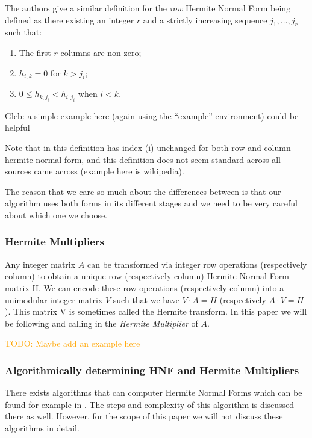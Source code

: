 \documentclass[oneside, a4paper, onecolumn, 11pt]{article}
\newcommand{\todo}[1]{
    \begin{mdframed}
        \textcolor{orange}{
        TODO: #1
        }
    \end{mdframed}
}
\begin{document}
The authors give a similar definition for the \textit{row} Hermite Normal Form being defined as there existing an integer \(r\) and a strictly increasing sequence \(j_1, \dots, j_r\) such that:
\begin{enumerate}[label=(\roman*)]
    \item The first \(r\) columns are non-zero;
    \item \(h_{i, k} = 0\) for \(k > j_i\);
    \item \(0 \le h_{k, j_i} < h_{i, j_i}\) when \(i < k\).
\end{enumerate}

{\color{purple}Gleb: a simple example here (again using the ``example'' environment) could be helpful}

Note that in this definition has index (i) unchanged for both row and column hermite normal form, and this definition does not seem standard across all sources came across (example here is wikipedia).

The reason that we care so much about the differences between is that our algorithm uses both forms in its different stages and we need to be very careful about which one we choose.

\subsubsection{Hermite Multipliers}

Any integer matrix \(A\) can be transformed via integer row operations (respectively column) to obtain a unique row (respectively column) Hermite Normal Form matrix H. We can encode these row operations (respectively column) into a unimodular integer matrix \(V\) such that we have \(V \cdot A = H\) (respectively \(A \cdot V = H\)). This matrix V is sometimes called the Hermite transform. In this paper we will be following \cite{Hubert2013} and calling in the \textit{Hermite Multiplier} of \(A\).

\todo{Maybe add an example here}

\subsubsection{Algorithmically determining HNF and Hermite Multipliers}

There exists algorithms that can computer Hermite Normal Forms which can be found for example in \cite{cohen2013course}. The steps and complexity of this algorithm is discussed there as well. However, for the scope of this paper we will not discuss these algorithms in detail.
\end{document}
